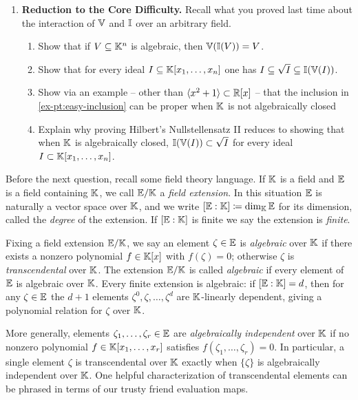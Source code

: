 \documentclass[12pt,reqno]{amsart}
\begin{document}
\begin{enumerate}[leftmargin=*]
\item\label{ex:null-reduction} \textbf{Reduction to the Core Difficulty.} Recall what you proved last time about the interaction of $\mathbb{V}$ and $\mathbb{I}$ over an arbitrary field.
\begin{enumerate}[label=(\alph*),ref=\theenumi\alph*]
\item Show that if $V\subseteq \mathbb{K}^n$ is algebraic, then $\mathbb{V}(\mathbb{I}(V))=V$.
\item\label{ex-pt:easy-inclusion} Show that for every ideal $I \subseteq \mathbb{K}[x_1,\ldots,x_n]$ one has $I \subseteq \sqrt{I} \subseteq \mathbb{I}(\mathbb{V}(I))$.
\item Show via an example -- other than $\langle x^2+1\rangle \subset \mathbb{R}[x]$ -- that the inclusion in \ref{ex-pt:easy-inclusion} can be proper when $\mathbb{K}$ is not algebraically closed 
\item Explain why proving Hilbert's Nullstellensatz II reduces to showing that when $\mathbb{K}$ is algebraically closed, $\mathbb{I}(\mathbb{V}(I)) \subset \sqrt{I}$ for every ideal $I \subset \mathbb{K}[x_1,\ldots,x_n]$.
\end{enumerate}

\end{enumerate}

\hrulefill

Before the next question, recall some field theory language. If $\mathbb{K}$ is a field and $\mathbb{E}$ is a field containing $\mathbb{K}$, we call $\mathbb{E}/\mathbb{K}$ a \emph{field extension}. In this situation $\mathbb{E}$ is naturally a vector space over $\mathbb{K}$, and we write $[\mathbb{E}:\mathbb{K}]\coloneqq \dim_{\mathbb{K}} \mathbb{E}$ for its dimension, called the \emph{degree} of the extension. If $[\mathbb{E}:\mathbb{K}]$ is finite we say the extension is \emph{finite}. 

Fixing a field extension $\mathbb{E}/\mathbb{K}$, we say an element $\zeta \in \mathbb{E}$ is \emph{algebraic} over $\mathbb{K}$ if there exists a nonzero polynomial $f\in \mathbb{K}[x]$ with $f(\zeta)=0$; otherwise $\zeta$ is \emph{transcendental} over $\mathbb{K}$. The extension $\mathbb{E}/\mathbb{K}$ is called \emph{algebraic} if every element of $\mathbb{E}$ is algebraic over $\mathbb{K}$. Every finite extension is algebraic: if $[\mathbb{E}:\mathbb{K}]=d$, then for any $\zeta \in \mathbb{E}$ the $d+1$ elements $\zeta^{0}, \zeta,\ldots, \zeta^d$ are $\mathbb{K}$-linearly dependent, giving a polynomial relation for $\zeta$ over $\mathbb{K}$.

More generally, elements $\zeta_1,\ldots,\zeta_r\in \mathbb{E}$ are \emph{algebraically independent} over $\mathbb{K}$ if no nonzero polynomial $f\in \mathbb{K}[x_1,\ldots,x_r]$ satisfies $f(\zeta_1,\ldots,\zeta_r)=0$. In particular, a single element $\zeta$ is transcendental over $\mathbb{K}$ exactly when $\{\zeta\}$ is algebraically independent over $\mathbb{K}$. One helpful characterization of transcendental elements can be phrased in terms of our trusty friend evaluation maps. 
\end{document}
